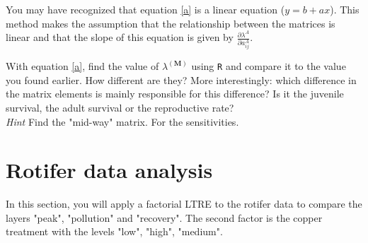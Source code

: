 \documentclass{article}\usepackage[]{graphicx}\usepackage[]{color}
\begin{document}
You may have recognized that equation \ref{a} is a linear equation ($y=b+ax$). This method makes the assumption that the relationship between the matrices is linear and that the slope of this equation is given by $\frac{ \partial\lambda^{A}}{\partial a^{A}_{ij}}$.


With equation \ref{a}, find the value of $\lambda^{(\boldsymbol{M})}$ using \texttt{R} and compare it to the value you found earlier. How different are they? More interestingly: which difference in the matrix elements is mainly responsible for this difference? Is it the juvenile survival, the adult survival or the reproductive rate?\\[1.5ex]

\textit{Hint} Find the "mid-way" matrix. For the sensitivities.

\section{Rotifer data analysis}
In this section, you will apply a factorial LTRE to the rotifer data to compare the layers "peak", "pollution" and "recovery". The second factor is the copper treatment with the levels "low", "high", "medium".
\end{document}
